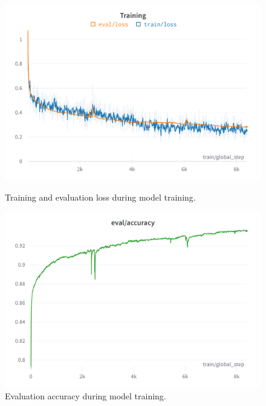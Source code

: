 \begin{figure}[htp]
    \centering
    \includegraphics[width=\textwidth]{figures/wandb-train-loss-gpt-j-smart-contract.png}
    \caption{Training and evaluation loss during model training.}
    \label{fig:wandb-train-loss-gpt-j-smart-contract}

    \vspace*{\floatsep}%

    \includegraphics[width=\textwidth]{figures/wandb-train-eval-gpt-j-smart-contract.png}
    \caption{Evaluation accuracy during model training.}
    \label{fig:wandb-train-eval-gpt-j-smart-contract}
\end{figure}
%

